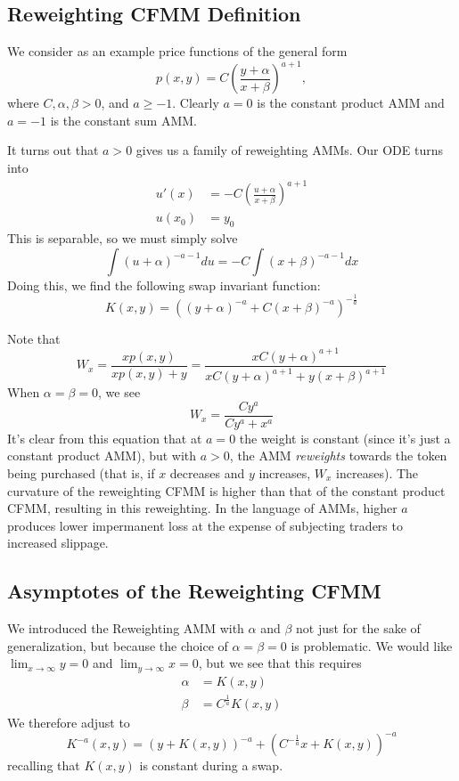 \documentclass[11pt]{article} %
\begin{document}
\subsection{Reweighting CFMM Definition}

We consider as an example price functions of the general form
$$
p(x,y) = C\left(\frac{y + \alpha}{x + \beta}\right)^{a+1},
$$
where $C,\alpha,\beta > 0$, and $a \geq -1$. Clearly $a=0$ is the constant product AMM and $a=-1$ is the constant sum AMM.

It turns out that $a>0$ gives us a family of reweighting AMMs.
Our ODE turns into
\begin{align*}
u'(x) &= - C\left(\frac{u + \alpha}{x + \beta}\right)^{a+1}\\
u(x_0) &= y_0
\end{align*}
This is separable, so we must simply solve
$$
\int (u + \alpha)^{-a-1} du = -C\int (x + \beta)^{-a-1} dx
$$
Doing this, we find the following swap invariant function:
$$
K(x,y) = \left((y + \alpha)^{-a} + C(x + \beta)^{-a}\right)^{-\frac{1}{a}}
$$

Note that
$$
W_x = \frac{xp(x,y)}{xp(x,y) + y} = \frac{xC\left(y + \alpha\right)^{a+1}}{xC\left(y + \alpha\right)^{a+1} + y(x + \beta)^{a+1}}
$$
When $\alpha = \beta = 0$, we see
$$
W_x = \frac{Cy^a}{Cy^a + x^a}
$$
It's clear from this equation that at $a=0$ the weight is constant (since it's just a constant product AMM), but with $a>0$, the AMM \emph{reweights} towards the token being purchased
(that is, if $x$ decreases and $y$ increases, $W_x$ increases).
The curvature of the reweighting CFMM is higher than that of the constant product CFMM, resulting in this reweighting.
In the language of AMMs, higher $a$ produces lower impermanent loss at the expense of subjecting traders to increased slippage.

\subsection{Asymptotes of the Reweighting CFMM}

We introduced the Reweighting AMM with $\alpha$ and $\beta$ not just for the sake of generalization, but because the choice of $\alpha = \beta = 0$ is problematic.
We would like $\lim_{x\to \infty} y = 0$ and $\lim_{y\to \infty} x = 0$, but we see that this requires
\begin{align*}
\alpha &= K(x,y)\\
\beta &= C^\frac{1}{a} K(x,y)
\end{align*}
We therefore adjust to
$$
K^{-a}(x,y) = (y + K(x,y))^{-a} + (C^{-\frac{1}{a}}x + K(x,y))^{-a}
$$
recalling that $K(x,y)$ is constant during a swap.
\end{document}
